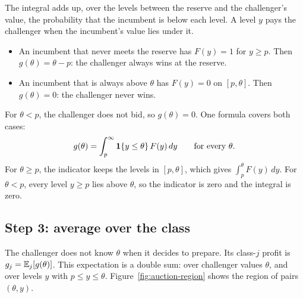 \begin{intuition}
The integral adds up, over the levels between the reserve and the challenger's value, the probability that the
incumbent is below each level. A level \(y\) pays the challenger when the incumbent's value lies under it.
\begin{itemize}
\item An incumbent that never meets the reserve has \(F(y)=1\) for \(y\ge p\). Then \(g(\theta)=\theta-p\): the
challenger always wins at the reserve.
\item An incumbent that is always above \(\theta\) has \(F(y)=0\) on \([p,\theta]\). Then \(g(\theta)=0\): the
challenger never wins.
\end{itemize}
\end{intuition}

For \(\theta<p\), the challenger does not bid, so \(g(\theta)=0\). One formula covers both cases:
\[
g(\theta)=\int_p^\infty\mathbf{1}\{y\le\theta\}\,F(y)\,dy\qquad\text{for every }\theta.
\]
For \(\theta\ge p\), the indicator keeps the levels in \([p,\theta]\), which gives \(\int_p^\theta F(y)\,dy\).
For \(\theta<p\), every level \(y\ge p\) lies above \(\theta\), so the indicator is zero and the integral is zero.

\subsection*{Step 3: average over the class}

The challenger does not know \(\theta\) when it decides to prepare. Its class-\(j\) profit is
\(g_j=\mathbb{E}_j[g(\theta)]\). This expectation is a double sum: over challenger values \(\theta\), and over levels
\(y\) with \(p\le y\le\theta\). Figure~\ref{fig:auction-region} shows the region of pairs \((\theta,y)\).

